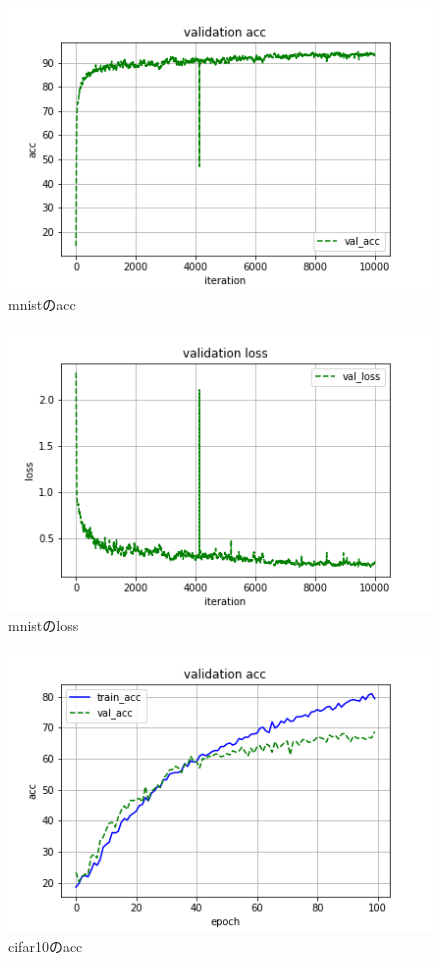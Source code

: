 \documentclass[twocolumn]{jarticle}     %
\begin{document}
\begin{figure}[h]
	\centering	\includegraphics[scale=0.5]{acc__.png}
	\caption{mnistのacc\label{fig:graph1}}
\end{figure}
\begin{figure}[h]
	\centering	\includegraphics[scale=0.5]{loss__.png}
	\caption{mnistのloss\label{fig:graph2}}
\end{figure}
\begin{figure}[ht]
	\centering	\includegraphics[scale=0.5]{acc_4.png}
	\caption{cifar10のacc\label{fig:graph3}}
\end{figure}
\end{document}
